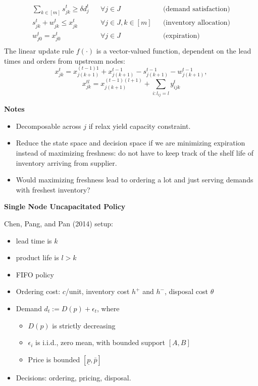 \documentclass{article}
\newcommand{\pa}[1]{\noindent\textbf{\textsf{#1}}}
\begin{document}
\begin{align*} 
   \sum_{k \in [m]} s_{jk}^t \geq {\delta} d_j^t && \forall j \in J && \text{(demand satisfaction)} \\
   s_{jk}^t + w_{jk}^t \leq x_{jk}^t && \forall j \in J, k \in [m] && \text{(inventory allocation)} \\
   w_{j0}^t = x_{j0}^t && \forall j \in J && \text{(expiration)} \\
\end{align*}
The linear update rule $f(\cdot)$ is a vector-valued function, dependent on the lead times and orders from upstream nodes: $$x^t_{jk} = x^{(t-1)1}_{j(k+1)} + x^{t-1}_{j(k+1)} - s^{t-1}_{j(k+1)} - w^{t-1}_{j(k+1)},$$
$$x^{tl}_{jk} = x^{(t-1)(l+1)}_{j(k+1)} + \sum_{i : l_{ij} = l} y^{t}_{ijk}$$
\newline

\pa{Notes}
\begin{itemize}
\item Decomposable across $j$ if relax yield capacity constraint.
\item Reduce the state space and decision space if we are minimizing expiration instead of maximizing freshness: do not have to keep track of the shelf life of inventory arriving from supplier.
\item Would maximizing freshness lead to ordering a lot and just serving demands with freshest inventory?
\end{itemize}


\pa{Single Node Uncapacitated Policy}
\newline 

Chen, Pang, and Pan (2014) setup:
\begin{itemize}
\item lead time is $k$
\item product life is $l > k$
\item FIFO policy
\item Ordering cost: $c$/unit, inventory cost $h^+$ and $h^-$, disposal cost $\theta$
\item Demand $d_t := D(p) + \epsilon_t$, where 
	\begin{itemize}
	\item $D(p)$ is strictly decreasing
	\item $\epsilon_i$ is i.i.d., zero mean, with bounded support $[A,B]$ 
	\item Price is bounded $[\underline{p}, \bar{p}]$
	\end{itemize}
\item Decisions: ordering, pricing, disposal. 
\end{itemize} 
\end{document}
